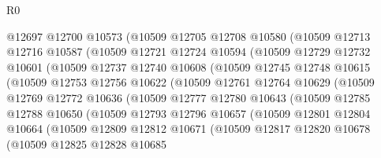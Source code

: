 \begin{lexlean}{R0}
\begin{coremodule}
                @12697
                @12700
                @10573
                (@10509
                  @12705
                  @12708
                  @10580
                  (@10509
                    @12713
                    @12716
                    @10587
                    (@10509
                      @12721
                      @12724
                      @10594
                      (@10509
                        @12729
                        @12732
                        @10601
                        (@10509
                          @12737
                          @12740
                          @10608
                          (@10509
                            @12745
                            @12748
                            @10615
                            (@10509
                              @12753
                              @12756
                              @10622
                              (@10509
                                @12761
                                @12764
                                @10629
                                (@10509
                                  @12769
                                  @12772
                                  @10636
                                  (@10509
                                    @12777
                                    @12780
                                    @10643
                                    (@10509
                                      @12785
                                      @12788
                                      @10650
                                      (@10509
                                        @12793
                                        @12796
                                        @10657
                                        (@10509
                                          @12801
                                          @12804
                                          @10664
                                          (@10509
                                            @12809
                                            @12812
                                            @10671
                                            (@10509
                                              @12817
                                              @12820
                                              @10678
                                              (@10509
                                                @12825
                                                @12828
                                                @10685

\end{coremodule}
\end{lexlean}

